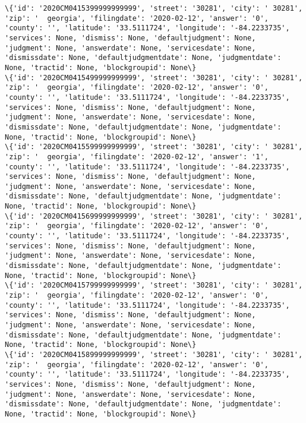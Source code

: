 \documentclass[11pt]{article}
\begin{document}
\begin{Verbatim}[commandchars=\\\{\}]
\{'id': '2020CM0415399999999999', 'street': '30281', 'city': ' 30281', 'zip': '  georgia', 'filingdate': '2020-02-12', 'answer': '0', 'county': '', 'latitude': '33.5111724', 'longitude': '-84.2233735', 'services': None, 'dismiss': None, 'defaultjudgment': None, 'judgment': None, 'answerdate': None, 'servicesdate': None, 'dismissdate': None, 'defaultjudgmentdate': None, 'judgmentdate': None, 'tractid': None, 'blockgroupid': None\}
\{'id': '2020CM0415499999999999', 'street': '30281', 'city': ' 30281', 'zip': '  georgia', 'filingdate': '2020-02-12', 'answer': '0', 'county': '', 'latitude': '33.5111724', 'longitude': '-84.2233735', 'services': None, 'dismiss': None, 'defaultjudgment': None, 'judgment': None, 'answerdate': None, 'servicesdate': None, 'dismissdate': None, 'defaultjudgmentdate': None, 'judgmentdate': None, 'tractid': None, 'blockgroupid': None\}
\{'id': '2020CM0415599999999999', 'street': '30281', 'city': ' 30281', 'zip': '  georgia', 'filingdate': '2020-02-12', 'answer': '1', 'county': '', 'latitude': '33.5111724', 'longitude': '-84.2233735', 'services': None, 'dismiss': None, 'defaultjudgment': None, 'judgment': None, 'answerdate': None, 'servicesdate': None, 'dismissdate': None, 'defaultjudgmentdate': None, 'judgmentdate': None, 'tractid': None, 'blockgroupid': None\}
\{'id': '2020CM0415699999999999', 'street': '30281', 'city': ' 30281', 'zip': '  georgia', 'filingdate': '2020-02-12', 'answer': '0', 'county': '', 'latitude': '33.5111724', 'longitude': '-84.2233735', 'services': None, 'dismiss': None, 'defaultjudgment': None, 'judgment': None, 'answerdate': None, 'servicesdate': None, 'dismissdate': None, 'defaultjudgmentdate': None, 'judgmentdate': None, 'tractid': None, 'blockgroupid': None\}
\{'id': '2020CM0415799999999999', 'street': '30281', 'city': ' 30281', 'zip': '  georgia', 'filingdate': '2020-02-12', 'answer': '0', 'county': '', 'latitude': '33.5111724', 'longitude': '-84.2233735', 'services': None, 'dismiss': None, 'defaultjudgment': None, 'judgment': None, 'answerdate': None, 'servicesdate': None, 'dismissdate': None, 'defaultjudgmentdate': None, 'judgmentdate': None, 'tractid': None, 'blockgroupid': None\}
\{'id': '2020CM0415899999999999', 'street': '30281', 'city': ' 30281', 'zip': '  georgia', 'filingdate': '2020-02-12', 'answer': '0', 'county': '', 'latitude': '33.5111724', 'longitude': '-84.2233735', 'services': None, 'dismiss': None, 'defaultjudgment': None, 'judgment': None, 'answerdate': None, 'servicesdate': None, 'dismissdate': None, 'defaultjudgmentdate': None, 'judgmentdate': None, 'tractid': None, 'blockgroupid': None\}

\end{Verbatim}
\end{document}
